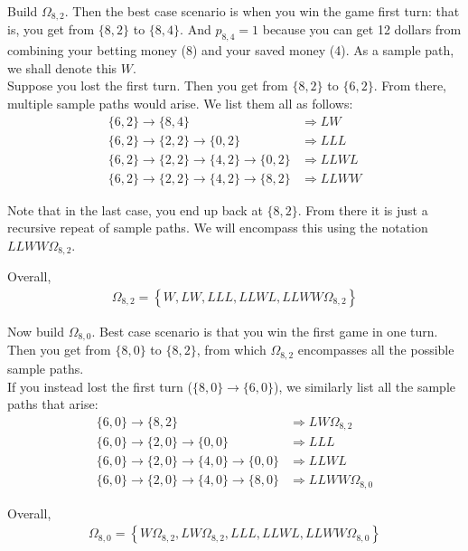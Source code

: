 \documentclass[12pt]{article}
\begin{document}
Build $\Omega_{8, 2}$. Then the best case scenario is when you win the game first turn: that is, you get from $\{8, 2\}$ to $\{8, 4\}$. And $p_{8, 4} = 1$ because you can get 12 dollars from combining your betting money (8) and your saved money (4). As a sample path, we shall denote this $W$.\\

Suppose you lost the first turn. Then you get from $\{8, 2\}$ to $\{6, 2\}$. From there, multiple sample paths would arise. We list them all as follows:
\begin{align*}
\{6, 2\} \rightarrow \{8, 4\} &\Longrightarrow LW\\
\{6, 2\} \rightarrow \{2, 2\} \rightarrow \{0, 2\} &\Longrightarrow LLL\\
\{6, 2\} \rightarrow \{2, 2\} \rightarrow \{4, 2\} \rightarrow \{0, 2\} &\Longrightarrow LLWL\\
\{6, 2\} \rightarrow \{2, 2\} \rightarrow \{4, 2\} \rightarrow \{8, 2\} &\Longrightarrow LLWW
\end{align*}

Note that in the last case, you end up back at $\{ 8, 2\}$. From there it is just a recursive repeat of sample paths. We will encompass this using the notation $LLWW\Omega_{8, 2}$.

Overall,
\begin{align*}
\Omega_{8, 2} = \left\{ W, LW, LLL, LLWL, LLWW\Omega_{8, 2} \right\}
\end{align*}

Now build $\Omega_{8, 0}$. Best case scenario is that you win the first game in one turn. Then you get from $\{8, 0\}$ to $\{8, 2\}$, from which $\Omega_{8, 2}$ encompasses all the possible sample paths.\\

If you instead lost the first turn ($\{8, 0\} \rightarrow \{6, 0\}$), we similarly list all the sample paths that arise:
\begin{align*}
\{6, 0\} \rightarrow \{8, 2\} &\Longrightarrow LW\Omega_{8, 2}\\
\{6, 0\} \rightarrow \{2, 0\} \rightarrow \{0, 0\} &\Longrightarrow LLL\\
\{6, 0\} \rightarrow \{2, 0\} \rightarrow \{4, 0\} \rightarrow \{0, 0\} &\Longrightarrow LLWL\\
\{6, 0\} \rightarrow \{2, 0\} \rightarrow \{4, 0\} \rightarrow \{8, 0\} &\Longrightarrow LLWW\Omega_{8, 0}
\end{align*}

Overall,
\begin{align*}
\Omega_{8, 0} = \left\{ W\Omega_{8, 2}, LW\Omega_{8, 2}, LLL, LLWL, LLWW\Omega_{8, 0} \right\}
\end{align*}
\end{document}
